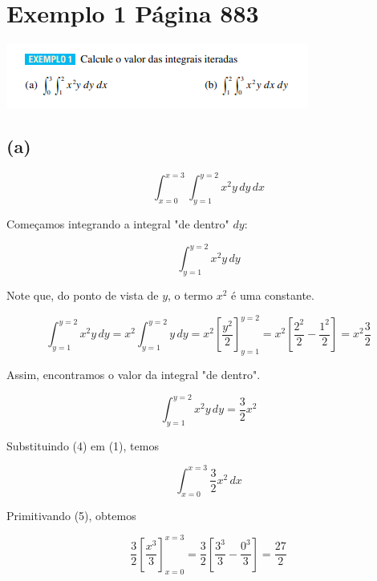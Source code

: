
\section*{Exemplo 1 Página 883}

\begin{center}
    \includegraphics[scale=1.25]{enunciado.png}
\end{center}

\subsection*{(a)}

\begin{equation}
    \int_{x=0}^{x=3} \int_{y=1}^{y=2} x^2y \, dy \, dx
\end{equation}

Começamos integrando a integral "de dentro" $dy$:

\begin{equation}
    \int_{y=1}^{y=2} x^2y \, dy
\end{equation}

Note que, do ponto de vista de $y$, o termo $x^2$ é uma constante.

\begin{equation}
    \int_{y=1}^{y=2} x^2y \, dy =
    x^2\int_{y=1}^{y=2} y \, dy =
    x^2 \left[\frac{y^2}{2}\right]_{y=1}^{y=2} =
    x^2 \left[\frac{2^2}{2} - \frac{1^2}{2}\right] =
    x^2 \frac{3}{2}
\end{equation}

Assim, encontramos o valor da integral "de dentro".

\begin{equation}
    \int_{y=1}^{y=2} x^2y \, dy = \frac{3}{2} x^2
\end{equation}

Substituindo (4) em (1), temos

\begin{equation}
    \int_{x=0}^{x=3} \frac{3}{2} x^2  \, dx
\end{equation}

Primitivando (5), obtemos

\begin{equation}
    \frac{3}{2} \left[\frac{x^3}{3}\right]_{x=0}^{x=3} = 
    \frac{3}{2} \left[\frac{3^3}{3} - \frac{0^3}{3}\right] = 
    \frac{27}{2}
\end{equation}

